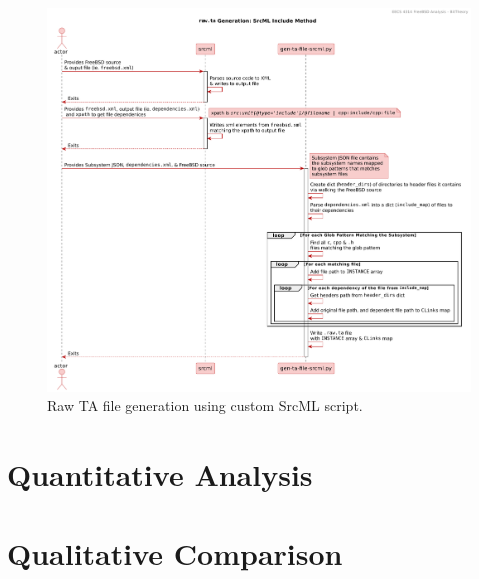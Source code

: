 \documentclass[12pt, dvipsnames, a4paper]{article}
\begin{document}
\begin{figure}[!htb]
	\center
	\includegraphics[width = 450pt]{assets/sequence_diagrams/srcml_includes.pdf}
	\caption{Raw TA file generation using custom SrcML script.}
\end{figure}

\section{Quantitative Analysis}
\lipsum[1]

\section{Qualitative Comparison}
\end{document}

